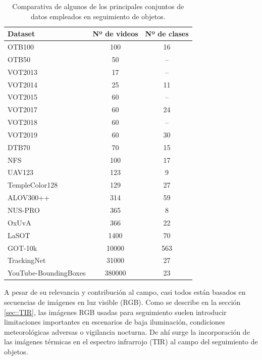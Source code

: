 \vspace{0.35cm}
\begin{table}[htbp]
\captionsetup{font=small, skip=8pt}
\centering
\renewcommand{\arraystretch}{1.15}
\small
\begin{tabular}{|p{7.6cm}|c|c|}
\hline
\textbf{Dataset} & \textbf{Nº de videos} & \textbf{Nº de clases} \\
\hline
OTB100 \cite{OTB100} & 100 & 16 \\
\hline
OTB50 \cite{Articulo_OTB} & 50 & -- \\
\hline
VOT2013 \cite{VOT2013_Challenge} & 17 & -- \\
\hline
VOT2014 \cite{VOT2014} & 25 & 11 \\
\hline
VOT2015 \cite{VOT2015_Dataset} & 60 & -- \\
\hline
VOT2017 \cite{VOT2017} & 60 & 24 \\
\hline
VOT2018 \cite{VOT2018} & 60 & -- \\
\hline
VOT2019 \cite{VOT2019} & 60 & 30 \\
\hline
DTB70 \cite{Li_Yeung_2017} & 70 & 15 \\
\hline
NFS \cite{NFS} & 100 & 17 \\
\hline
UAV123 \cite{UAV123} & 123 & 9 \\
\hline
TempleColor128 \cite{Liang_Color_Tracking} & 129 & 27 \\
\hline
ALOV300++ \cite{ALOV300++} & 314 & 59 \\
\hline
NUS-PRO \cite{NUS_PRO} & 365 & 8 \\
\hline
OxUvA \cite{OxUvA} & 366 & 22 \\
\hline
LaSOT \cite{LaSOT} & 1400 & 70 \\
\hline
GOT-10k \cite{GOT10K} & 10000 & 563 \\
\hline
TrackingNet \cite{TrackingNet} & 31000 & 27 \\
\hline
YouTube-BoundingBoxes \cite{YTbboxes} & 380000 & 23 \\
\hline
\end{tabular}
\caption{Comparativa de algunos de los principales conjuntos de datos empleados en seguimiento de objetos.}
\label{tab:comparativa-datasets-sot}
\end{table}

A pesar de su relevancia y contribución al campo, casi todos están basados en secuencias de imágenes en luz visible (RGB). Como se describe en la sección \ref{sec::TIR}, las imágenes RGB usadas para seguimiento suelen introducir limitaciones importantes en escenarios de baja iluminación, condiciones meteorológicas adversas o vigilancia nocturna. De ahí surge la incorporación de las imágenes térmicas en el espectro infrarrojo (TIR) al campo del seguimiento de objetos.

